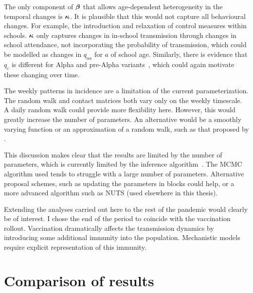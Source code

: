 \documentclass[thesis.tex]{subfiles}
\begin{document}
The only component of $\bm{\beta}$ that allows age-dependent heterogeneity in the temporal changes is $\bm{\kappa}$.
It is plausible that this would not capture all behavioural changes.
For example, the introduction and relaxation of control measures within schools.
$\bm{\kappa}$ only captures changes in in-school transmission through changes in school attendance, not incorporating the probability of transmission, which could be modelled as changes in $q_{aa}$ for $a$ of school age.
Similarly, there is evidence that $q_c$ is different for Alpha and pre-Alpha variants~\autocite{zhuRole}, which could again motivate these changing over time.

The weekly patterns in incidence are a limitation of the current parameterization.
The random walk and contact matrices both vary only on the weekly timescale.
A daily random walk could provide more flexibility here.
However, this would greatly increase the number of parameters.
An alternative would be a smoothly varying function or an approximation of a random walk, such as that proposed by \textcite{ghoshApproximate}.

This discussion makes clear that the results are limited by the number of parameters, which is currently limited by the inference algorithm~.
The MCMC algorithm used tends to struggle with a large number of parameters.
Alternative proposal schemes, such as updating the parameters in blocks could help, or a more advanced algorithm such as NUTS (used elsewhere in this thesis).

Extending the analyses carried out here to the rest of the pandemic would clearly be of interest.
I chose the end of the period to coincide with the vaccination rollout.
Vaccination dramatically affects the transmission dynamics by introducing some additional immunity into the population.
Mechanistic models require explicit representation of this immunity.

\section{Comparison of results} \label{transmission:sec:comparison}
\end{document}
